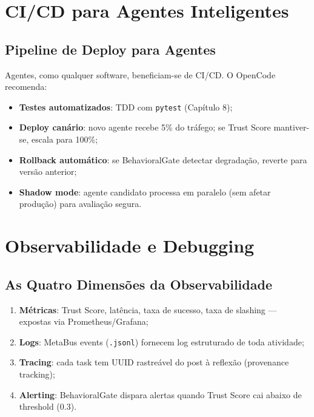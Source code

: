 \section{CI/CD para Agentes Inteligentes}

\subsection{Pipeline de Deploy para Agentes}

Agentes, como qualquer software, beneficiam-se de CI/CD. O OpenCode recomenda:

\begin{itemize}
    \item \textbf{Testes automatizados}: TDD com \texttt{pytest} (Capítulo 8);
    \item \textbf{Deploy canário}: novo agente recebe 5\% do tráfego; se Trust Score mantiver-se, escala para 100\%;
    \item \textbf{Rollback automático}: se BehavioralGate detectar degradação, reverte para versão anterior;
    \item \textbf{Shadow mode}: agente candidato processa em paralelo (sem afetar produção) para avaliação segura.
\end{itemize}

\section{Observabilidade e Debugging}

\subsection{As Quatro Dimensões da Observabilidade}

\begin{enumerate}
    \item \textbf{Métricas}: Trust Score, latência, taxa de sucesso, taxa de slashing — expostas via Prometheus/Grafana;
    \item \textbf{Logs}: MetaBus events (\texttt{.jsonl}) fornecem log estruturado de toda atividade;
    \item \textbf{Tracing}: cada task tem UUID rastreável do post à reflexão (provenance tracking);
    \item \textbf{Alerting}: BehavioralGate dispara alertas quando Trust Score cai abaixo de threshold (0.3).
\end{enumerate}

